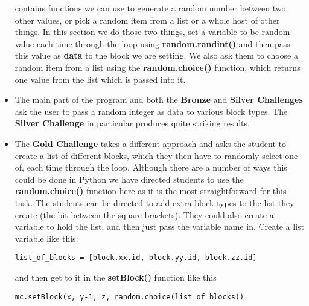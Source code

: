 \documentclass{geocraft-lesson-plan}
\begin{document}
\begin{itemize}
  contains functions we can use to generate a random number between two other values, or pick a random item from a list
  or a whole host of other things. In this section we do those two things, set a variable to be random value each time
  through the loop using \textbf{random.randint()} and then pass this value as \textbf{data} to the block we are
  setting. We also ask them to choose a random item from a list using the \textbf{random.choice()} function, which
  returns one value from the list which is passed into it.
\item The main part of the program and both the \textbf{Bronze} and \textbf{Silver Challenges} ask the user to pass a
  random integer as data to various block types. The \textbf{Silver Challenge} in particular produces quite striking
  results. 
\item The \textbf{Gold Challenge} takes a different approach and asks the student to create a list of different blocks,
which they then have to randomly select one of, each time through the loop. Although there are a number of ways this
could be done in Python we have directed students to use the \textbf{random.choice()} function here as it is the most
straightforward for this task. The students can be directed to add extra block types to the list they create (the bit
between the square brackets). They could also create a variable to hold the list, and then just pass the variable name
in. Create a list variable like this: \begin{verbatim}list_of_blocks = [block.xx.id, block.yy.id, block.zz.id]\end{verbatim}  
and then get to it in the \textbf{setBlock()} function like this  
\begin{verbatim}mc.setBlock(x, y-1, z, random.choice(list_of_blocks))\end{verbatim}  
\end{itemize}
\end{document}
